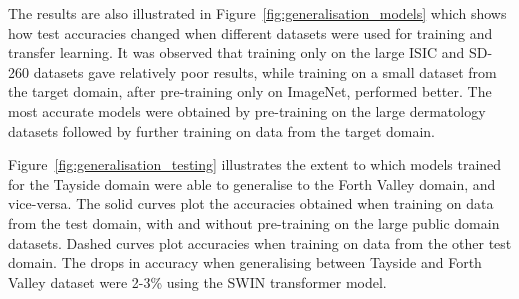 The results are also illustrated in Figure~\ref{fig:generalisation_models} which shows how test accuracies changed when different datasets were used for training and transfer learning. It was observed that training only on the large ISIC and SD-260 datasets gave relatively poor results, while training on a small dataset from the target domain, after pre-training only on ImageNet, performed better. The most accurate models were obtained by pre-training on the large dermatology datasets followed by further training on data from the target domain.

Figure~\ref{fig:generalisation_testing} illustrates the extent to which models trained for the Tayside domain were able to generalise to the Forth Valley domain, and vice-versa. The solid curves plot the accuracies obtained when training on data from the test domain, with and without pre-training on the large public domain datasets. Dashed curves plot accuracies when training on data from the other test domain. The drops in accuracy when generalising between Tayside and Forth Valley dataset were 2-3\% using the SWIN transformer model.


